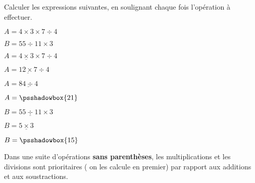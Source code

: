 \begin{exemple}[0.35]
   Calculer les expressions suivantes, en soulignant chaque fois l'opération à effectuer.
   
   $A=4\times 3\times 7\div 4$
   
   $B=55\div 11\times 3$
   \correction
   
   \bigskip
   \begin{minipage}{0.54\linewidth}
      \begin{list}{}{}
               \item $A=\underline{4\times 3}\times 7\div 4$
               \item $A=\underline{12\times 7}\div 4$
               \item $A=\underline{84\div 4}$
               \item $A=\psshadowbox{21}$               
      \end{list}
   \end{minipage}      
   \begin{minipage}{0.45\linewidth}
      \begin{list}{}{}
         \item $B=\underline{55\div 11}\times 3$
         \item $B=\underline{5\times 3}$
         \item $B=\psshadowbox{15}$
      \end{list}
   \end{minipage}   
\end{exemple}

\begin{propriete}[\admise]
   Dans une suite d'opérations \textbf{sans parenthèses}, les multiplications et les divisions sont prioritaires ( on les calcule en premier) par rapport aux additions et aux soustractions.
\end{propriete}

